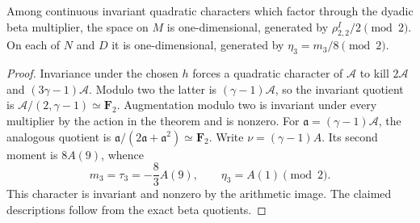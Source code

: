 \begin{corollary}\label{cor:beta-quadratic-invariants}
Among continuous invariant quadratic characters which factor through
the dyadic beta multiplier, the space on $M$ is one-dimensional,
generated by $\rho_{2,2}^I/2\pmod2$. On each of $N$ and $D$ it
is one-dimensional, generated by $\eta_3=m_3/8\pmod2$.
\end{corollary}
\begin{proof}
Invariance under the chosen $h$ forces a quadratic character of
$\mathcal A$ to kill $2\mathcal A$ and $(3\gamma-1)\mathcal A$.
Modulo two the latter is $(\gamma-1)\mathcal A$, so the invariant
quotient is $\mathcal A/(2,\gamma-1)\simeq\mathbf F_2$.
Augmentation modulo two is invariant under every multiplier by
the action in the theorem and is nonzero.
For $\mathfrak a=(\gamma-1)\mathcal A$, the analogous quotient
is $\mathfrak a/(2\mathfrak a+\mathfrak a^2)\simeq\mathbf F_2$.
Write $\nu=(\gamma-1)A$. Its second moment is $8A(9)$, whence
\[
 m_3=\tau_3=-\frac{8}{3}A(9),\qquad
 \eta_3=A(1)\pmod2.
\]
This character is invariant and nonzero by the arithmetic image.
The claimed descriptions follow from the exact beta quotients.
\end{proof}
